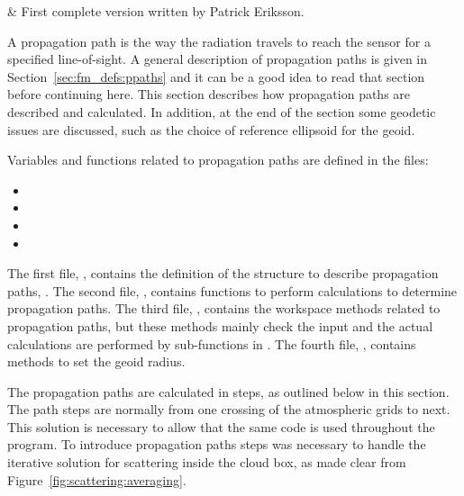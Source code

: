 \label{sec:ppath}


 & First complete version written by Patrick Eriksson.\\
\stophistory



A propagation path is the way the radiation travels to reach the
sensor for a specified line-of-sight. A general description of
propagation paths is given in Section~\ref{sec:fm_defs:ppaths} and it
can be a good idea to read that section before continuing here. This
section describes how propagation paths are described and calculated.
In addition, at the end of the section some geodetic issues are
discussed, such as the choice of reference ellipsoid for the geoid.


Variables and functions related to propagation paths are defined in the files:
\begin{itemize}
\item {}
\item {}
\item {}
\item {}
\end{itemize}
The first file, , contains the definition of the
structure to describe propagation paths, . The
second file, , contains functions to perform
calculations to determine propagation paths. The third file,
, contains the workspace methods related to
propagation paths, but these methods mainly check the input and the
actual calculations are performed by sub-functions in
. The fourth file, ,
contains methods to set the geoid radius.




\label{sec:ppath:approach}

The propagation paths are calculated in steps, as outlined below in
this section. The path steps are normally from one crossing of the
atmospheric grids to next. This solution is necessary to allow that
the same code is used throughout the program. To introduce propagation
paths steps was necessary to handle the iterative solution for
scattering inside the cloud box, as made clear from
Figure~\ref{fig:scattering:averaging}.

